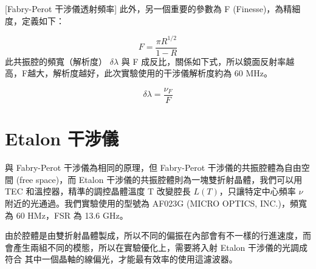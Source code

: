 \documentclass[class=NCU_thesis, crop=false]{standalone}
\begin{document}
[Fabry-Perot 干涉儀透射頻率]
此外，另一個重要的參數為 F (Finesse)，為精細度，定義如下：

\begin{equation}
    F=\frac{\pi R^{1/2}}{1-R}
\end{equation}
此共振腔的頻寬（解析度） $\delta \lambda$ 與 F 成反比，關係如下式，所以鏡面反射率越高，F越大，解析度越好，此次實驗使用的干涉儀解析度約為 60 MHz。

\begin{equation}
    \delta \lambda=\frac{\nu_{F}}{F}
\end{equation}

\section{Etalon 干涉儀}
與 Fabry-Perot 干涉儀為相同的原理，但 Fabry-Perot 干涉儀的共振腔體為自由空間 (free space)，而 Etalon 干涉儀的共振腔體則為一塊雙折射晶體，我們可以用 TEC 和溫控器，精準的調控晶體溫度 T 改變腔長 $L(T)$，只讓特定中心頻率 $\nu$ 附近的光通過。我們實驗使用的型號為 AF023G (MICRO OPTICS, INC.)，頻寬為 60 HMz，FSR 為 13.6 GHz。

由於腔體是由雙折射晶體製成，所以不同的偏振在內部會有不一樣的行進速度，而會產生兩組不同的模態，所以在實驗優化上，需要將入射 Etalon 干涉儀的光調成符合
其中一個晶軸的線偏光，才能最有效率的使用這濾波器。
\end{document}
